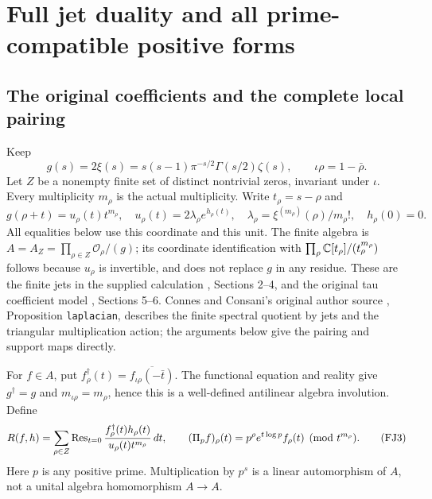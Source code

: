 \section{Full jet duality and all prime-compatible positive forms}


\subsection{The original coefficients and the complete local pairing}
Keep
\[
 g(s)=2\xi(s)=s(s-1)\pi^{-s/2}\Gamma(s/2)\zeta(s),\qquad
 \iota\rho=1-\bar\rho.
 \tag{FJ1}\label{fj:fj:objects}
\]
Let $Z$ be a nonempty finite set of distinct nontrivial zeros, invariant
under $\iota$. Every multiplicity $m_\rho$ is the actual multiplicity.
Write $t_\rho=s-\rho$ and
\[
 g(\rho+t)=u_\rho(t)t^{m_\rho},\quad
 u_\rho(t)=2\lambda_\rho e^{h_\rho(t)},\quad
 \lambda_\rho=\xi^{(m_\rho)}(\rho)/m_\rho!,\quad h_\rho(0)=0.
 \tag{FJ2}
\]
All equalities below use this coordinate and this unit. The finite algebra is
$A=A_Z=\prod_{\rho\in Z}\mathcal O_\rho/(g)$; its coordinate identification
with $\prod_\rho\mathbb C[t_\rho]/(t_\rho^{m_\rho})$ follows because $u_\rho$
is invertible, and does not replace $g$ in any residue.
These are the finite jets in the supplied calculation \cite{FJprime},
Sections 2--4, and the original tau coefficient model \cite{FJtau},
Sections 5--6. Connes and Consani's original author source
\cite{ConnesConsaniHochschild}, Proposition \texttt{laplacian}, describes the finite
spectral quotient by jets and the triangular multiplication action;
the arguments below give the pairing and support maps directly.

For $f\in A$, put
$f^\dagger_\rho(t)=\overline{f_{\iota\rho}(-\bar t)}$.
The functional equation and reality give $g^\dagger=g$ and
$m_{\iota\rho}=m_\rho$, hence this is a well-defined antilinear algebra
involution. Define
\[
 R(f,h)=\sum_{\rho\in Z}\operatorname{Res}_{t=0}
       \frac{f^\dagger_\rho(t)h_\rho(t)}{u_\rho(t)t^{m_\rho}}\,dt,
 \qquad (\Pi_p f)_\rho(t)=p^\rho e^{t\log p}f_\rho(t)\pmod {t^{m_\rho}}.
 \tag{FJ3}\label{fj:fj:raw}
\]
Here $p$ is any positive prime. Multiplication by $p^s$ is a linear
automorphism of $A$, not a unital algebra homomorphism $A\to A$.

